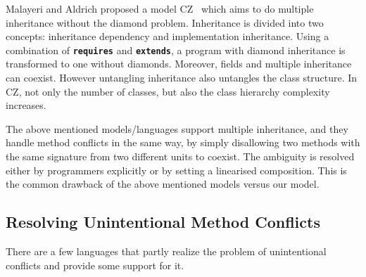 \begin{comment}
There are also proposals for extending Java with traits. For example, 
FeatherTrait Java (FTJ) [14] extends FJ [13] with statically-typed traits, 
adding trait-based inheritance in Java. Except for few, mostly syntac- tic details, 
their work can be emulated with Java 8 interfaces. There are also extensions 
to the original trait model, with operations (e.g. renaming [18], which breaks 
structural sub- typing) that default methods and interfaces cannot model.
\end{comment}

Malayeri and Aldrich proposed a model CZ~\cite{malayeri2009cz} which
aims to do multiple inheritance without the diamond problem.
Inheritance is divided into two concepts: inheritance dependency and
implementation inheritance.  Using a combination of
\textbf{\texttt{requires}} and \textbf{\texttt{extends}}, a program
with diamond inheritance is transformed to one without
diamonds. Moreover, fields and multiple inheritance can coexist.
However untangling inheritance also untangles the class structure. In
CZ, not only the number of classes, but also the class hierarchy
complexity increases.

The above mentioned models/languages support multiple inheritance, and
they handle method conflicts in the same way, by simply disallowing
two methods with the same signature from two different units to
coexist. The ambiguity is resolved either by programmers explicitly or
by setting a linearised composition. This is the common drawback of
the above mentioned models versus our model.

\subsection{Resolving Unintentional Method Conflicts}
There are a few languages that partly realize the problem of
unintentional conflicts and provide some support for it.

